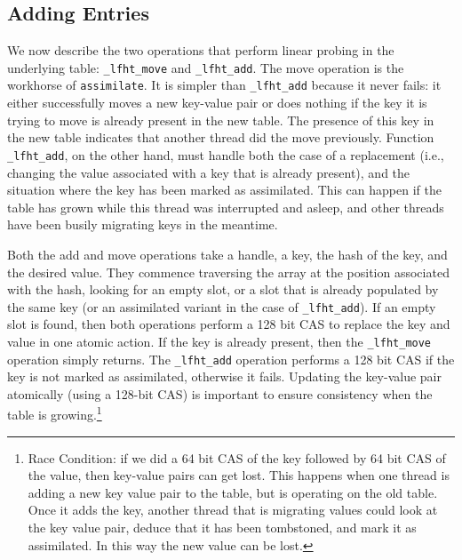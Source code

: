 \subsection{Adding Entries}

We now describe the two operations that perform linear probing in the
underlying table: \texttt{\_lfht\_move} and \texttt{\_lfht\_add}. The
move operation is the workhorse of \texttt{assimilate}. It is simpler
than \texttt{\_lfht\_add} because it never fails: it either
successfully moves a new key-value pair or does nothing if the key it
is trying to move is already present in the new table. The presence of
this key in the new table indicates that another thread did the move
previously. Function \texttt{\_lfht\_add}, on the other hand, must
handle both the case of a replacement (i.e., changing the value
associated with a key that is already present), and the situation
where the key has been marked as assimilated.  This can happen if the
table has grown while this thread was interrupted and asleep, and
other threads have been busily migrating keys in the meantime.

Both the add and move operations take a handle, a key, the hash of the
key, and the desired value. They commence traversing the array at the
position associated with the hash, looking for an empty slot, or a
slot that is already populated by the same key (or an assimilated
variant in the case of \texttt{\_lfht\_add}). If an empty slot is
found, then both operations perform a 128 bit CAS to replace the key
and value in one atomic action.  If the key is already present, then
the \texttt{\_lfht\_move} operation simply returns. The
\texttt{\_lfht\_add} operation performs a 128 bit CAS if the key is
not marked as assimilated, otherwise it fails. Updating the key-value
pair atomically (using a 128-bit CAS) is important to ensure
consistency when the table is growing.\footnote{Race Condition: if we
  did a 64 bit CAS of the key followed by 64 bit CAS of the value,
  then key-value pairs can get lost.  This happens when one thread is
  adding a new key value pair to the table, but is operating on the
  old table. Once it adds the key, another thread that is migrating
  values could look at the key value pair, deduce that it has been
  tombstoned, and mark it as assimilated. In this way the new value
  can be lost.}





